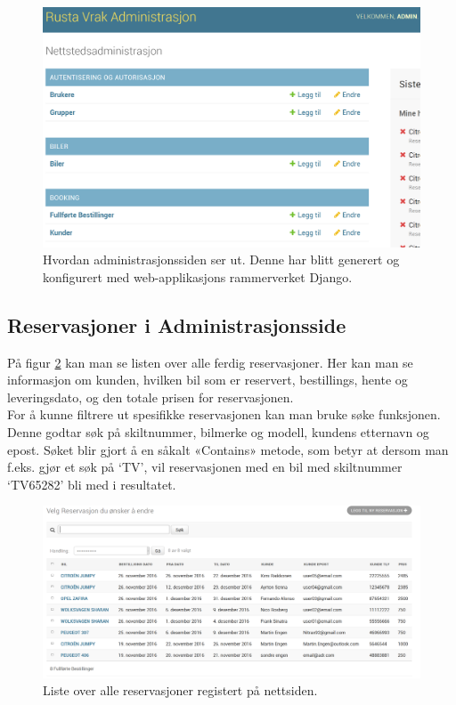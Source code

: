  \begin{figure}[htbp]
	\centering
		\includegraphics[scale=0.3]{Bilder/admin_forside.png}
	\caption[Forside i Administrasjons Side]{Hvordan administrasjonssiden ser ut. Denne har blitt generert og konfigurert med web-applikasjons rammerverket Django. } %
	\label{fig:admin_front}
\end{figure}
\newpage
\subsection{Reservasjoner i Administrasjonsside}
På figur \ref{fig:admin_list} kan man se listen over alle ferdig reservasjoner. Her kan man se informasjon om kunden, hvilken bil som er reservert, bestillings, hente og leveringsdato, og den totale prisen for reservasjonen. \\
For å kunne filtrere ut spesifikke reservasjonen kan man bruke søke funksjonen. Denne godtar søk på skiltnummer, bilmerke og modell, kundens etternavn og epost. Søket blir gjort å en såkalt «Contains» metode, som betyr at dersom man f.eks. gjør et søk på ‘TV’, vil reservasjonen med en bil med skiltnummer ‘TV65282’ bli med i resultatet.

 \begin{figure}[htbp]
	\centering
		\includegraphics[width=16cm, keepaspectratio]{Bilder/admin_liste2.png}
	\caption[Administrasjonsside - Oversikt over reservasjoner]{Liste over alle reservasjoner registert på nettsiden. } %
	\label{fig:admin_list}
\end{figure}





